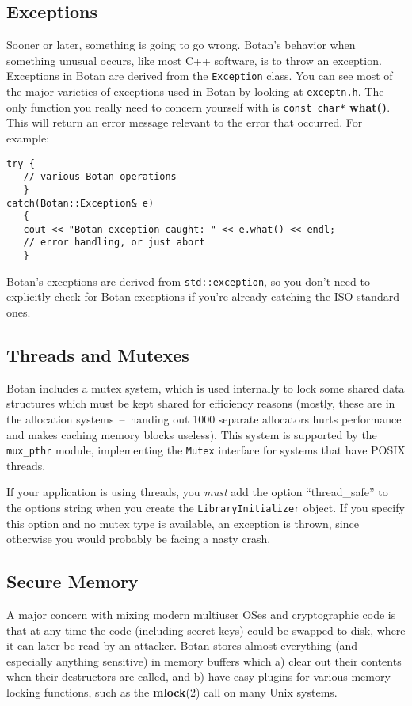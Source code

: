 \documentclass{article}
\newcommand{\filename}[1]{\texttt{#1}}
\newcommand{\function}[1]{\textbf{#1}}
\newcommand{\type}[1]{\texttt{#1}}
\begin{document}
\subsection{Exceptions}

Sooner or later, something is going to go wrong. Botan's behavior when
something unusual occurs, like most C++ software, is to throw an exception.
Exceptions in Botan are derived from the \type{Exception} class. You can see
most of the major varieties of exceptions used in Botan by looking at
\filename{exceptn.h}. The only function you really need to concern yourself
with is \type{const char*} \function{what()}. This will return an error message
relevant to the error that occurred. For example:

\begin{verbatim}
try {
   // various Botan operations
   }
catch(Botan::Exception& e)
   {
   cout << "Botan exception caught: " << e.what() << endl;
   // error handling, or just abort
   }
\end{verbatim}

Botan's exceptions are derived from \type{std::exception}, so you don't need
to explicitly check for Botan exceptions if you're already catching the ISO
standard ones.

\subsection{Threads and Mutexes}

Botan includes a mutex system, which is used internally to lock some shared
data structures which must be kept shared for efficiency reasons (mostly, these
are in the allocation systems~--~handing out 1000 separate allocators hurts
performance and makes caching memory blocks useless). This system is supported
by the \texttt{mux\_pthr} module, implementing the \type{Mutex} interface for
systems that have POSIX threads.

If your application is using threads, you \emph{must} add the option
``thread\_safe'' to the options string when you create the
\type{LibraryInitializer} object. If you specify this option and no mutex type
is available, an exception is thrown, since otherwise you would probably be
facing a nasty crash.

\subsection{Secure Memory}

A major concern with mixing modern multiuser OSes and cryptographic
code is that at any time the code (including secret keys) could be
swapped to disk, where it can later be read by an attacker. Botan
stores almost everything (and especially anything sensitive) in memory
buffers which a) clear out their contents when their destructors are
called, and b) have easy plugins for various memory locking functions,
such as the \function{mlock}(2) call on many Unix systems.
\end{document}
